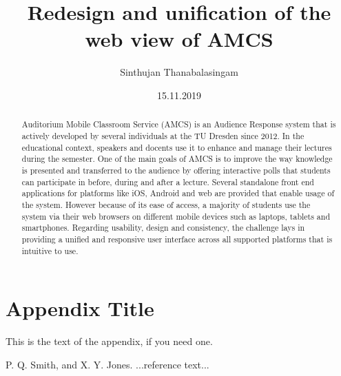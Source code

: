 \documentclass[ngerman]{tudscrreprt}
\begin{document}
	\date{15.11.2019}
	\author{Sinthujan Thanabalasingam}
	\title{Redesign and unification of the web view of AMCS}
	\maketitle
	
\begin{abstract}
	
Auditorium Mobile Classroom Service (AMCS) is an Audience Response system that is actively developed by several individuals at the TU Dresden since 2012. In the educational context, speakers and docents use it to enhance and manage their lectures during the semester. One of the main goals of AMCS is to improve the way knowledge is presented and transferred to the audience by offering interactive polls that students can participate in before, during and after a lecture.
Several standalone front end applications for platforms like iOS, Android and web are provided that enable usage of the system. However because of its ease of access, a majority of students use the system via their web browsers on different mobile devices such as laptops, tablets and smartphones. 
Regarding usability, design and consistency, the challenge lays in providing a unified and responsive user interface across all supported platforms that is intuitive to use.
	
\end{abstract}









\appendix
\section{Appendix Title}

This is the text of the appendix, if you need one.






\begin{thebibliography}{}
	
	P. Q. Smith, and X. Y. Jones. ...reference text...
	
\end{thebibliography}
\end{document}
